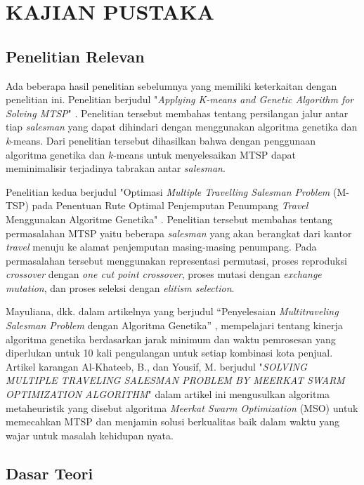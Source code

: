 \chapter{KAJIAN PUSTAKA}

\section{Penelitian Relevan}

Ada beberapa hasil penelitian sebelumnya yang memiliki keterkaitan dengan penelitian ini. Penelitian berjudul "\textit{Applying K-means and Genetic Algorithm for Solving MTSP}" \cite{inproceedings}. Penelitian tersebut membahas tentang persilangan jalur antar tiap \textit{salesman} yang dapat dihindari dengan menggunakan algoritma genetika dan \textit{k}-means. Dari penelitian tersebut dihasilkan bahwa dengan penggunaan algoritma genetika dan $k$-means untuk menyelesaikan MTSP dapat meminimalisir terjadinya tabrakan antar \textit{salesman}.

Penelitian kedua berjudul "Optimasi \textit{Multiple Travelling Salesman Problem} (M-TSP) pada Penentuan Rute Optimal Penjemputan Penumpang \textit{Travel} Menggunakan Algoritme Genetika" \cite{raditya2017optimasi}. Penelitian tersebut membahas tentang permasalahan MTSP yaitu beberapa \textit{salesman} yang akan berangkat dari kantor \textit{travel} menuju ke alamat penjemputan masing-masing penumpang. Pada permasalahan tersebut menggunakan representasi permutasi, proses reproduksi \textit{crossover} dengan \textit{one cut point crossover}, proses mutasi dengan \textit{exchange mutation}, dan proses seleksi dengan \textit{elitism selection}.

Mayuliana, dkk. dalam artikelnya yang berjudul “Penyelesaian \textit{Multitraveling Salesman Problem} dengan Algoritma Genetika” \cite{mayuliana2015penyelesaian}, mempelajari tentang kinerja algoritma genetika berdasarkan jarak minimum dan waktu pemrosesan yang diperlukan untuk 10 kali pengulangan untuk setiap kombinasi kota penjual. Artikel karangan Al-Khateeb, B., dan Yousif, M. berjudul "\textit{SOLVING MULTIPLE TRAVELING SALESMAN PROBLEM BY MEERKAT SWARM OPTIMIZATION ALGORITHM}" \cite{al2019solving} dalam artikel ini mengusulkan algoritma metaheuristik yang disebut algoritma \textit{Meerkat Swarm Optimization} (MSO) untuk memecahkan MTSP dan menjamin solusi berkualitas baik dalam waktu yang wajar untuk masalah kehidupan nyata.

\section{Dasar Teori}

